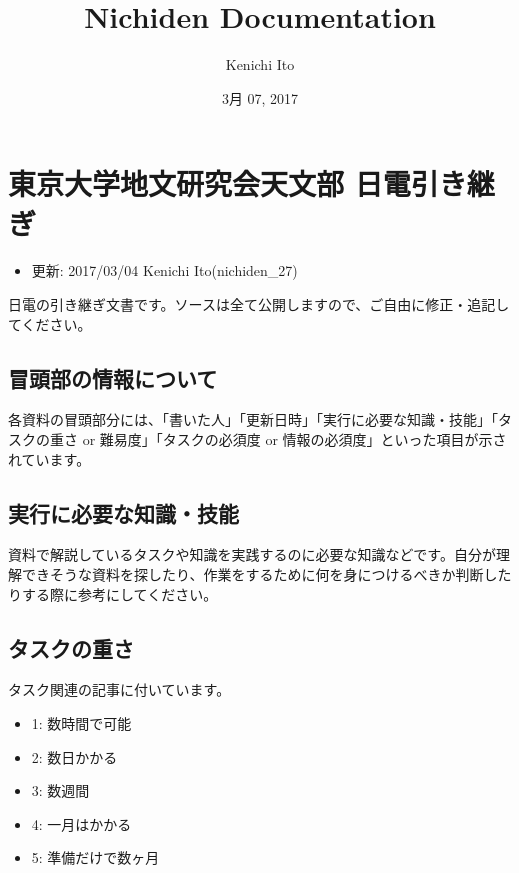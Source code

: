\documentclass[letterpaper,10pt,dvipdfmx]{sphinxmanual}
\title{Nichiden Documentation}
\date{3月 07, 2017}
\author{Kenichi Ito}
\begin{document}
\maketitle
\sphinxtableofcontents
{}\label{\detokenize{index::doc}}



\chapter{東京大学地文研究会天文部 日電引き継ぎ}
\label{\detokenize{main:}}\label{\detokenize{main::doc}}\label{\detokenize{main:id1}}\begin{itemize}
\item {} 
更新: 2017/03/04 Kenichi Ito(nichiden\_27)

\end{itemize}

日電の引き継ぎ文書です。ソースは全て公開しますので、ご自由に修正・追記してください。



\section{冒頭部の情報について}
\label{\detokenize{main:}}\label{\detokenize{main:id2}}
各資料の冒頭部分には、「書いた人」「更新日時」「実行に必要な知識・技能」「タスクの重さ or 難易度」「タスクの必須度 or 情報の必須度」といった項目が示されています。


\section{実行に必要な知識・技能}
\label{\detokenize{main:}}\label{\detokenize{main:id3}}
資料で解説しているタスクや知識を実践するのに必要な知識などです。自分が理解できそうな資料を探したり、作業をするために何を身につけるべきか判断したりする際に参考にしてください。


\section{タスクの重さ}
\label{\detokenize{main:}}\label{\detokenize{main:id4}}
タスク関連の記事に付いています。
\begin{itemize}
\item {} 
1: 数時間で可能

\item {} 
2: 数日かかる

\item {} 
3: 数週間

\item {} 
4: 一月はかかる

\item {} 
5: 準備だけで数ヶ月

\end{itemize}
\end{document}
